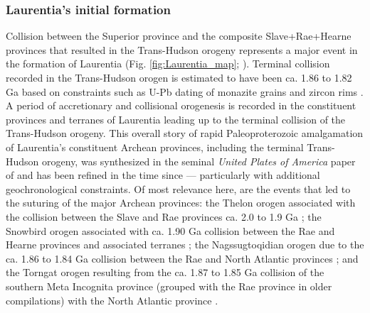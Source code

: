 \documentclass[twocolumn, switch]{article} %
\begin{document}
\subsubsection{Laurentia's initial formation}
Collision between the Superior province and the composite Slave+Rae+Hearne provinces that resulted in the Trans-Hudson orogeny represents a major event in the formation of Laurentia (Fig. \ref{fig:Laurentia_map}; \citealp{Corrigan2009a}). Terminal collision recorded in the Trans-Hudson orogen is estimated to have been ca. 1.86 to 1.82 Ga based on constraints such as U-Pb dating of monazite grains and zircon rims \citep{Skipton2016a, Weller2017a}. A period of accretionary and collisional orogenesis is recorded in the constituent provinces and terranes of Laurentia leading up to the terminal collision of the Trans-Hudson orogeny. This overall story of rapid Paleoproterozoic amalgamation of Laurentia's constituent Archean provinces, including the terminal Trans-Hudson orogeny, was synthesized in the seminal \textit{United Plates of America} paper of \citet{Hoffman1988a} and has been refined in the time since --- particularly with additional geochronological constraints. Of most relevance here, are the events that led to the suturing of the major Archean provinces: the Thelon orogen associated with the collision between the Slave and Rae provinces ca. 2.0 to 1.9 Ga \citep{Hoffman1989c}; the Snowbird orogen associated with ca. 1.90 Ga collision between the Rae and Hearne provinces and associated terranes \citep{Berman2007a, Thiessen2020a}; the Nagssugtoqidian orogen due to the ca. 1.86 to 1.84 Ga collision between the Rae and North Atlantic provinces \citep{St-Onge2009a}; and the Torngat orogen resulting from the ca. 1.87 to 1.85 Ga collision of the southern Meta Incognita province (grouped with the Rae province in older compilations) with the North Atlantic province \citep{St-Onge2009a}.
\end{document}
